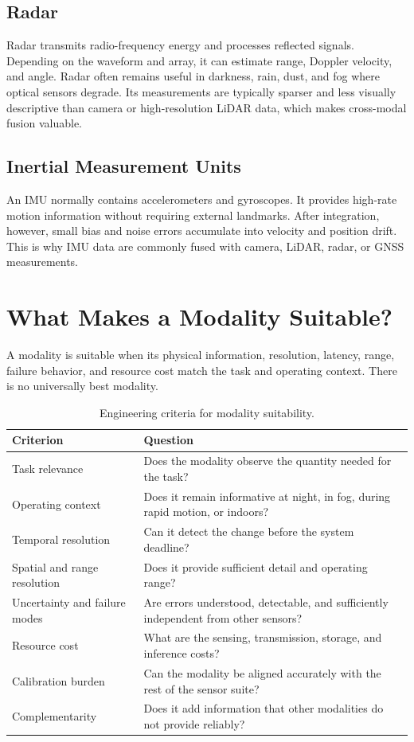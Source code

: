 \subsection{Radar}

Radar transmits radio-frequency energy and processes reflected signals. Depending on the waveform and array, it can estimate range, Doppler velocity, and angle. Radar often remains useful in darkness, rain, dust, and fog where optical sensors degrade. Its measurements are typically sparser and less visually descriptive than camera or high-resolution LiDAR data, which makes cross-modal fusion valuable.

\subsection{Inertial Measurement Units}

An IMU normally contains accelerometers and gyroscopes. It provides high-rate motion information without requiring external landmarks. After integration, however, small bias and noise errors accumulate into velocity and position drift. This is why IMU data are commonly fused with camera, LiDAR, radar, or GNSS measurements.

\section{What Makes a Modality Suitable?}

A modality is suitable when its physical information, resolution, latency, range, failure behavior, and resource cost match the task and operating context. There is no universally best modality.

\begin{table}[H]
\centering
\caption{Engineering criteria for modality suitability.}
\label{tab:modality-suitability}
\begin{tabularx}{\textwidth}{@{}p{3.1cm}X@{}}
\toprule
\textbf{Criterion} & \textbf{Question} \\
\midrule
Task relevance & Does the modality observe the quantity needed for the task? \\
Operating context & Does it remain informative at night, in fog, during rapid motion, or indoors? \\
Temporal resolution & Can it detect the change before the system deadline? \\
Spatial and range resolution & Does it provide sufficient detail and operating range? \\
Uncertainty and failure modes & Are errors understood, detectable, and sufficiently independent from other sensors? \\
Resource cost & What are the sensing, transmission, storage, and inference costs? \\
Calibration burden & Can the modality be aligned accurately with the rest of the sensor suite? \\
Complementarity & Does it add information that other modalities do not provide reliably? \\
\bottomrule
\end{tabularx}
\end{table}

